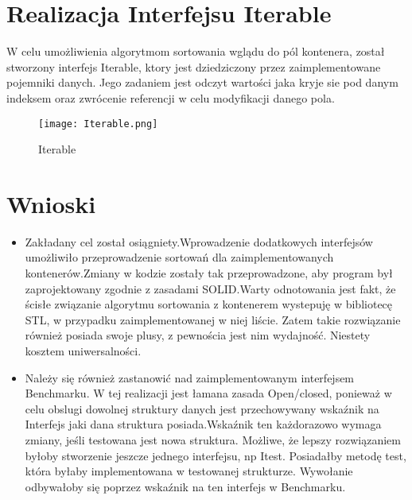 \documentclass[12pt,a4paper,titlepage]{article}
\begin{document}
\section{Realizacja Interfejsu Iterable}
W celu umożliwienia algorytmom sortowania wglądu do pól kontenera, został stworzony interfejs Iterable,
ktory jest dziedziczony przez zaimplementowane pojemniki danych. Jego zadaniem jest odczyt wartości jaka kryje sie pod danym indeksem oraz zwrócenie referencji w celu modyfikacji danego pola.
\begin{figure}[!htbp]
\begin{center}
\texttt{[image: Iterable.png]}
\caption{Iterable}
\end{center}
\end{figure}
\section{Wnioski}
\begin{itemize}
\item Zakładany cel został osiągniety.Wprowadzenie dodatkowych interfejsów umożliwiło przeprowadzenie sortowań dla zaimplementowanych kontenerów.Zmiany w kodzie zostały tak przeprowadzone, aby program był
zaprojektowany zgodnie z zasadami SOLID.Warty odnotowania jest fakt, że ścisłe związanie algorytmu sortowania z kontenerem wystepuję w bibliotecę STL, w przypadku zaimplementowanej w niej liście.
Zatem takie rozwiązanie również posiada swoje plusy, z pewnościa jest nim wydajność.
Niestety kosztem uniwersalności.
\item Należy się również zastanowić nad zaimplementowanym interfejsem Benchmarku. W tej realizacji jest łamana zasada Open/closed, ponieważ w celu obslugi dowolnej struktury danych jest przechowywany wskaźnik na Interfejs jaki dana struktura posiada.Wskaźnik ten każdorazowo wymaga zmiany, jeśli testowana jest nowa struktura.\newline
Możliwe, że lepszy rozwiązaniem byłoby stworzenie jeszcze jednego interfejsu, np Itest.
Posiadałby metodę test, która byłaby implementowana w testowanej strukturze.
Wywołanie odbywałoby się poprzez wskaźnik na ten interfejs w Benchmarku.
\end{itemize}
\end{document}
